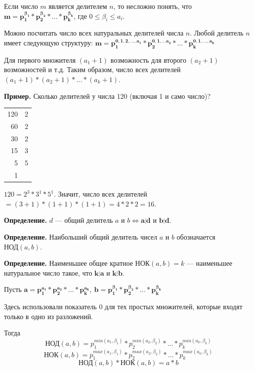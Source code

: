 \documentclass{article}
\begin{document}
            Если число \( m \) является делителем \( n \), то несложно понять, что \( \mathbf{m = p_1^{\beta_1}*p_2^{\beta_2}*...*p_k^{\beta_k}} \), где \( 0 \leq \beta_i \leq a_i \).

            Можно посчитать число всех натуральных делителей числа \( n \). Любой делитель \( n \) имеет следующую структуру: \( \mathbf{m = p_1^{0,1,2,...,a_1}*p_2^{0,1,...a_2}*...*p_k^{0,1,...,a_k}} \)

            Для первого множителя \( (a_1 + 1) \) возможность для второго \( (a_2 + 1) \) возможностей и т.д. Таким образом, число всех делителей \( (a_1 + 1)*(a_2 + 1)*...*(a_k + 1) \).

            \textbf{Пример.} Сколько делителей у числа 120 (включая 1 и само число)?

            \begin{tabular}{r|l}
              120 & 2\\
              60 & 2\\
              30 & 2\\
              15 & 3\\
              5 & 5\\
              1 & \\
            \end{tabular}

            \( 120 = 2^3 * 3^1 * 5^1 \). Значит, число всех делителей \( = (3 + 1)*(1 + 1)*(1 + 1) = 4*2*2 = 16 \).

            \textbf{Определение.} \( d \) --- общий делитель \( a \) и \( b \Leftrightarrow \mathbf{a \vdots d } \) и \( \mathbf{b \vdots d} \).

            \textbf{Определение.} Наибольший общий делитель чисел \( a \) и \( b \) обозначается \( \textrm{НОД}(a, b) \).

            \textbf{Определение.} Наименьшее общее кратное \( \textrm{НОК}(a, b) = k \) --- наименьшее натуральное число такое, что \( \mathbf{k \vdots a} \) и \( \mathbf{k \vdots b} \).

            Пусть \( \mathbf{a = p_1^{a_1} * p_2^{a_2} * ... * p_k^{a_k}},\ \mathbf{b = p_1^{\beta_1} * p_2^{\beta_2} * ... * p_k^{\beta_k}} \)

            Здесь использовали показатель 0 для тех простых множителей, которые входят только в одно из разложений.

            Тогда \[ \textrm{НОД}(a, b) = p_1^{min(a_1, \beta_1)} * p_2^{min(a_2, \beta_2)} * ... * p_k^{min(a_k, \beta_k)} \]
            \[ \textrm{НОК}(a, b) = p_1^{max(a_1, \beta_1)} * p_2^{max(a_2, \beta_2)} * ... * p_k^{max(a_k, \beta_k)} \]
            \[ \textrm{НОД}(a, b)*\textrm{НОК}(a, b) = a * b \]
\end{document}
